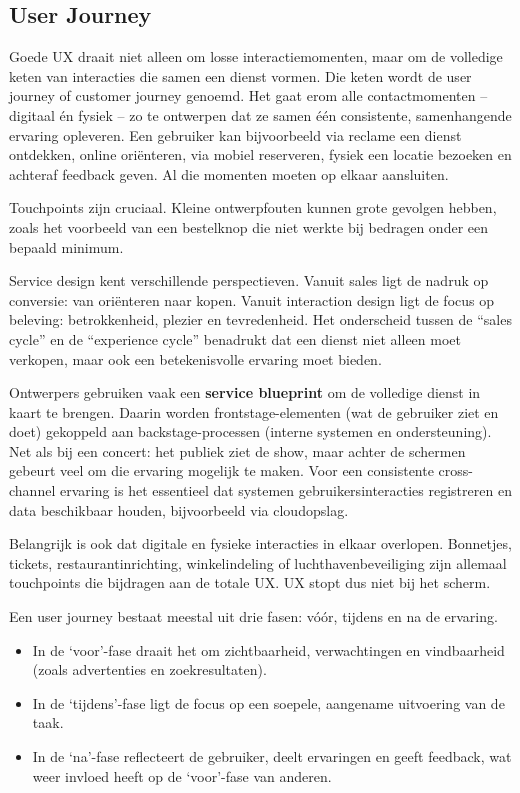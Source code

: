 \documentclass[nonacm, sigconf, balance=true]{acmart}
\begin{document}
    \subsection{User Journey}
    Goede UX draait niet alleen om losse interactiemomenten, maar om de volledige keten van interacties die samen een dienst vormen.
    Die keten wordt de user journey of customer journey genoemd.
    Het gaat erom alle contactmomenten – digitaal én fysiek – zo te ontwerpen dat ze samen één consistente, samenhangende ervaring opleveren.
    Een gebruiker kan bijvoorbeeld via reclame een dienst ontdekken, online oriënteren, via mobiel reserveren, fysiek een locatie bezoeken en achteraf feedback geven.
    Al die momenten moeten op elkaar aansluiten.

    Touchpoints zijn cruciaal.
    Kleine ontwerpfouten kunnen grote gevolgen hebben, zoals het voorbeeld van een bestelknop die niet werkte bij bedragen onder een bepaald minimum.

    Service design kent verschillende perspectieven.
    Vanuit sales ligt de nadruk op conversie: van oriënteren naar kopen.
    Vanuit interaction design ligt de focus op beleving: betrokkenheid, plezier en tevredenheid.
    Het onderscheid tussen de “sales cycle” en de “experience cycle” benadrukt dat een dienst niet alleen moet verkopen, maar ook een betekenisvolle ervaring moet bieden.

    Ontwerpers gebruiken vaak een \textbf{service blueprint} om de volledige dienst in kaart te brengen.
    Daarin worden frontstage-elementen (wat de gebruiker ziet en doet) gekoppeld aan backstage-processen (interne systemen en ondersteuning).
    Net als bij een concert: het publiek ziet de show, maar achter de schermen gebeurt veel om die ervaring mogelijk te maken.
    Voor een consistente cross-channel ervaring is het essentieel dat systemen gebruikersinteracties registreren en data beschikbaar houden, bijvoorbeeld via cloudopslag.

    Belangrijk is ook dat digitale en fysieke interacties in elkaar overlopen.
    Bonnetjes, tickets, restaurantinrichting, winkelindeling of luchthavenbeveiliging zijn allemaal touchpoints die bijdragen aan de totale UX. UX stopt dus niet bij het scherm.

    Een user journey bestaat meestal uit drie fasen: vóór, tijdens en na de ervaring.

    \begin{itemize}
        \item In de ‘voor’-fase draait het om zichtbaarheid, verwachtingen en vindbaarheid (zoals advertenties en zoekresultaten).
        \item In de ‘tijdens’-fase ligt de focus op een soepele, aangename uitvoering van de taak.
        \item In de ‘na’-fase reflecteert de gebruiker, deelt ervaringen en geeft feedback, wat weer invloed heeft op de ‘voor’-fase van anderen.
    \end{itemize}
\end{document}
